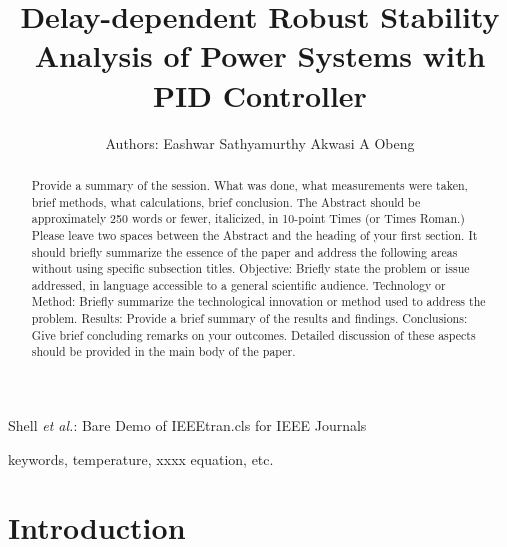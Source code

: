 \documentclass[journal]{IEEEtran}
\begin{document}
\title{Delay-dependent Robust Stability Analysis of Power Systems with PID Controller}

\author{ Authors: Eashwar Sathyamurthy  Akwasi A Obeng}
        
{Shell \MakeLowercase{\textit{et al.}}: Bare Demo of IEEEtran.cls for IEEE Journals}

\maketitle

\begin{abstract}
Provide a summary of the session. What was done, 
what measurements were taken, brief methods, what calculations, brief conclusion.  The Abstract should be approximately 250 words or fewer, italicized, in 10-point Times (or Times Roman.) Please leave two spaces between the Abstract and the heading of your first section.
It should briefly summarize the essence of the paper and address the following areas without using specific subsection titles. Objective: Briefly state the problem or issue addressed, in language accessible to a general scientific audience. Technology or Method: Briefly summarize the technological innovation or method used to address the problem. Results: Provide a brief summary of the results and findings. Conclusions: Give brief concluding remarks on your outcomes. Detailed discussion of these aspects should be provided in the main body of the paper.
\end{abstract}

\begin{IEEEkeywords}
keywords, temperature, xxxx equation, etc.
\end{IEEEkeywords}

\section{Introduction}
\end{document}
